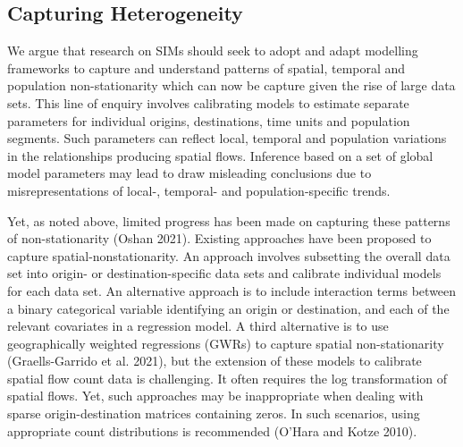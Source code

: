 \documentclass[11pt,letterpaper]{article}
\begin{document}
\hypertarget{capturing-heterogeneity}{%
\subsection{Capturing Heterogeneity}\label{capturing-heterogeneity}}

We argue that research on SIMs should seek to adopt and adapt modelling frameworks to capture and understand patterns of spatial, temporal and population non-stationarity which can now be capture given the rise of large data sets.
This line of enquiry involves calibrating models to estimate separate parameters for individual origins, destinations, time units and population segments.
Such parameters can reflect local, temporal and population variations in the relationships producing spatial flows.
Inference based on a set of global model parameters may lead to draw misleading conclusions due to misrepresentations of local-, temporal- and population-specific trends.

Yet, as noted above, limited progress has been made on capturing these patterns of non-stationarity (Oshan 2021).
Existing approaches have been proposed to capture spatial-nonstationarity.
An approach involves subsetting the overall data set into origin- or destination-specific data sets and calibrate individual models for each data set.
An alternative approach is to include interaction terms between a binary categorical variable identifying an origin or destination, and each of the relevant covariates in a regression model.
A third alternative is to use geographically weighted regressions (GWRs) to capture spatial non-stationarity (Graells-Garrido et al. 2021), but the extension of these models to calibrate spatial flow count data is challenging.
It often requires the log transformation of spatial flows.
Yet, such approaches may be inappropriate when dealing with sparse origin-destination matrices containing zeros.
In such scenarios, using appropriate count distributions is recommended (O'Hara and Kotze 2010).
\end{document}
